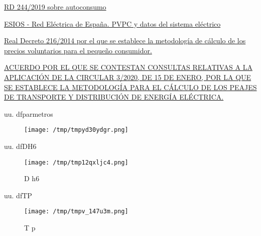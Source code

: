 \documentclass[a4paper,10pt,twocolumn]{article}
\begin{document}
\begin{Form}
\begin{thebibliography}{99}
\href{}{RD 244/2019  sobre autoconsumo}

\href{https://www.esios.ree.es/es/pvpc}{ESIOS - Red Eléctrica de España. PVPC y datos del sistema eléctrico
}


\href{}{Real Decreto 216/2014 por el que se establece la metodología de cálculo de los precios voluntarios para el pequeño consumidor.}


\href{https://www.cnmc.es/sites/default/files/3416756_135.pdf}{ACUERDO POR EL QUE SE CONTESTAN CONSULTAS RELATIVAS A LA
APLICACIÓN DE LA CIRCULAR 3/2020, DE 15 DE ENERO, POR LA QUE SE
ESTABLECE LA METODOLOGÍA PARA EL CÁLCULO DE LOS PEAJES DE
TRANSPORTE Y DISTRIBUCIÓN DE ENERGÍA ELÉCTRICA.}




\end{thebibliography}








\ifdefined\MostrarVariablesAlFinal
\newpage
\onecolumn



uu. dfparmetros

\begin{figure}[H] \centering
                    
                    \texttt{[image: /tmp/tmpyd30ydgr.png]}
                    \caption{}
                    
                    \label{fig:dfassssdfsa}
                    \end{figure}
                    

uu. dfDH6

\begin{figure}[H] \centering
                    
                    \texttt{[image: /tmp/tmp12qxljc4.png]}
                    \caption{D h6}
                    
                    \label{fig:dfassssdfsa}
                    \end{figure}
                    

uu. dfTP

\begin{figure}[H] \centering
                    
                    \texttt{[image: /tmp/tmpv\_147u3m.png]}
                    \caption{T p}
                    

\end{figure}
\end{Form}
\end{document}
